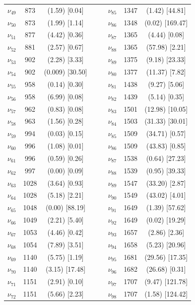 \begin{table}[H]
\begin{center}
\begin{threeparttable}
\begin{tabular}{c c c c c c c c}
					$\nu_{49}$&	873	&(1.59)	[0.04]& & & 	$\nu_{85}$&	1347&	(1.42)	[44.81]\\
					$\nu_{50}$&	873	&(1.99)	[1.14]& & & 	$\nu_{86}$&	1348&	(0.02)	[169.47]\\
					$\nu_{51}$&	877	&(4.42)	[0.36]& &  &	$\nu_{87}$&	1365&	(4.44)	[0.08]\\
					$\nu_{52}$&	881	&(2.57)	[0.67]& & & 	$\nu_{88}$&	1365&	(57.98)	[2.21]\\
					$\nu_{53}$&	902	&(2.28)	[3.33]& & & 	$\nu_{89}$&	1375&	(9.18)	[23.33]\\
					$\nu_{54}$&	902	&(0.009)	[30.50]& & & 	$\nu_{80}$&	1377&	(11.37)	[7.82]\\
					$\nu_{55}$&	958	&(0.14)	[0.30]	& & & $\nu_{81}$&	1438&	(9.27)	[5.06]\\
					$\nu_{56}$&	958	&(6.99)	[0.08]& & & 	$\nu_{82}$&	1439&	(5.14)	[0.35]\\
					$\nu_{57}$&	962	&(0.83)	[0.08]& & & 	$\nu_{83}$&	1501&	(12.98)	[10.05]\\
					$\nu_{58}$&	963	&(1.56)	[0.28]& &  &	$\nu_{84}$&	1503&	(31.33)	[30.01]\\
					$\nu_{59}$&	994	&(0.03)	[0.15]& &  &	$\nu_{85}$&	1509&	(34.71)	[0.57]\\
					$\nu_{60}$&	996	&(1.08)	[0.01]& &  &	$\nu_{86}$&	1509&	(43.83)	[0.85]\\
					$\nu_{61}$&	996	&(0.59)	[0.26]& & & 	$\nu_{87}$&	1538&	(0.64)	[27.23]\\
					$\nu_{62}$&	997	&(0.00)	[0.09]& & & 	$\nu_{88}$&	1539&	(0.95)	[39.33]\\
					$\nu_{63}$&	1028&	(3.64)	[0.93]& & & 	$\nu_{89}$&	1547&	(33.20)	[2.87]\\
					$\nu_{64}$&	1028&	(5.18)	[2.21]& & & 	$\nu_{90}$&	1549&	(43.02)	[4.01]\\
					$\nu_{65}$&	1048&	(0.00)	[88.19]& &  &	$\nu_{91}$&	1649	&(1.39)	[57.62]\\
					$\nu_{66}$&	1049&	(2.21)	[5.40]	& &  &$\nu_{92}$&	1649&	(0.02)	[19.29]\\
					$\nu_{67}$&	1053&	(4.46)	[0.42]& & & 	$\nu_{93}$&	1657&	(2.86)	[2.36]\\
					$\nu_{68}$&	1054&	(7.89)	[3.51]& & & 	$\nu_{94}$&	1658&	(5.23)	[20.96]\\
					$\nu_{69}$&	1140&	(5.75)	[1.19]& & & 	$\nu_{95}$&	1681&	(29.56)	[17.35]\\
					$\nu_{70}$&	1140&	(3.15)	[17.48]& & & 	$\nu_{96}$&	1682&	(26.68)	[0.31]\\
					$\nu_{71}$&	1151&	(2.91)	[0.10]	& & & $\nu_{97}$&	1707&	(9.47)	[121.78]\\
					$\nu_{72}$&	1151&	(5.66)	[2.23]& & & 	$\nu_{98}$&	1707&	(1.58)	[124.42]\\
					\bottomrule
				\end{tabular}
				

\end{threeparttable}
\end{center}
\end{table}
